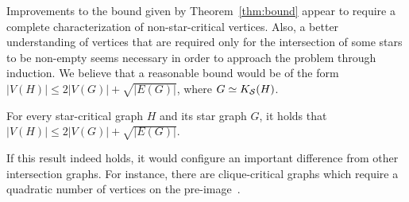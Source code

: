 Improvements to the bound given by Theorem~\ref{thm:bound} appear to require a complete characterization of non-star-critical vertices.
Also, a better understanding of vertices that are required only for the intersection of some stars to be non-empty seems necessary in order to approach the problem through induction.
We believe that a reasonable bound would be of the form $|V(H)| \leq 2|V(G)| + \sqrt{|E(G)|}$, where $G \simeq K_{\mathcal{S}}(H)$.

\begin{conjecture}
    For every star-critical graph $H$ and its star graph $G$, it holds that $|V(H)| \leq 2|V(G)| + \sqrt{|E(G)|}$.
\end{conjecture}

If this result indeed holds, it would configure an important difference from other intersection graphs.
For instance, there are clique-critical graphs which require a quadratic number of vertices on the pre-image~\cite{clique_critical_alcon}.